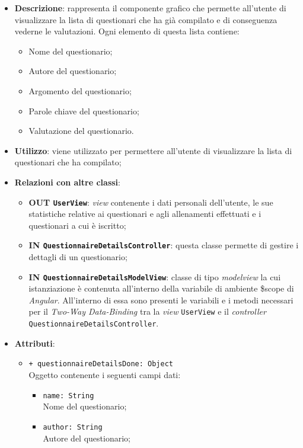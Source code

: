 \begin{itemize}
	\item \textbf{Descrizione}: rappresenta il componente grafico che permette all'utente di visualizzare la lista di questionari che ha già compilato e di conseguenza vederne le valutazioni. Ogni elemento di questa lista contiene:
	\begin{itemize}
		\item Nome del questionario;
		\item Autore del questionario;
		\item Argomento del questionario;
		\item Parole chiave del questionario;
		\item Valutazione del questionario.
	\end{itemize}
	\item \textbf{Utilizzo}: viene utilizzato per permettere all'utente di visualizzare la lista di questionari che ha compilato;
	\item \textbf{Relazioni con altre classi}: 
	\begin{itemize}
		\item \textbf{OUT \texttt{UserView}}: \textit{view} contenente i dati personali dell'utente, le sue statistiche relative ai questionari e agli allenamenti effettuati e i questionari a cui è iscritto;
		\item \textbf{IN \texttt{QuestionnaireDetailsController}}: questa classe permette di gestire i dettagli di un questionario;
		\item \textbf{IN \texttt{QuestionnaireDetailsModelView}}: classe di tipo \textit{modelview} la cui istanziazione è contenuta all'interno della variabile di ambiente \$scope di \textit{Angular}. All'interno di essa sono presenti le variabili e i metodi necessari per il \textit{Two-Way Data-Binding} tra la \textit{view} \texttt{UserView} e il \textit{controller} \texttt{QuestionnaireDetailsController}.
	\end{itemize}
	\item \textbf{Attributi}: 
	\begin{itemize}
		\item \texttt{+ questionnaireDetailsDone: Object} \\ Oggetto contenente i seguenti campi dati:
		\begin{itemize}
			\item \texttt{name: String}\\ Nome del questionario;
			\item \texttt{author: String}\\ Autore del questionario;

\end{itemize}
\end{itemize}
\end{itemize}
